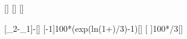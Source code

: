 [\degreeCelsius]
[\degreeCelsius]
[\per\kelvin]

[\vartheta_2-\vartheta_1]{\TBqX-\TAqX}[\kelvin]
[{-1}]{100*(exp(ln(1+\gaHgX*\dTqX)/3)-1)}[\percent]
[\,\gamma\,\Delta\vartheta]{100*\gaHgX*\dTqX/3}[\percent]
